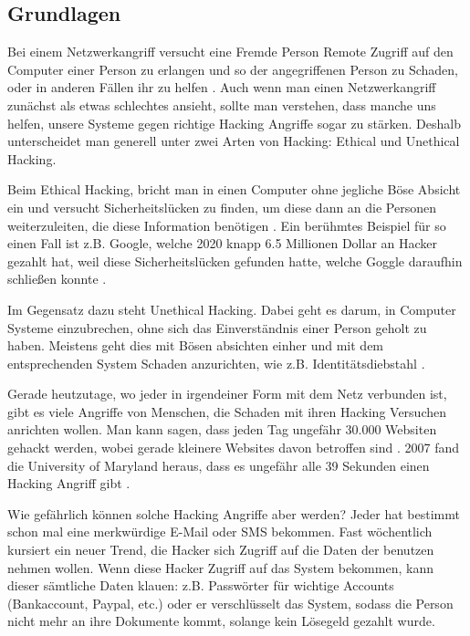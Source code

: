 \subsection{Grundlagen}
Bei einem Netzwerkangriff versucht eine Fremde Person Remote Zugriff auf den Computer einer Person zu erlangen und so der angegriffenen Person zu Schaden, oder in anderen Fällen ihr zu helfen \cite{ref_article1}. Auch wenn man einen Netzwerkangriff zunächst als etwas schlechtes ansieht, sollte man verstehen, dass manche uns helfen, unsere Systeme gegen richtige Hacking Angriffe sogar zu stärken. 
Deshalb unterscheidet man generell unter zwei Arten von Hacking: Ethical und Unethical Hacking. \par
Beim Ethical Hacking, bricht man in einen Computer ohne jegliche Böse Absicht ein und versucht Sicherheitslücken zu finden, um diese dann an die Personen weiterzuleiten, die diese Information benötigen \cite{ref_article1}. Ein berühmtes Beispiel für so einen Fall ist z.B. Google, welche 2020 knapp 6.5 Millionen Dollar an Hacker gezahlt hat, weil diese Sicherheitslücken gefunden hatte, welche Goggle daraufhin schließen konnte \cite{ref_url1}. \par
Im Gegensatz dazu steht Unethical Hacking. Dabei geht es darum, in Computer Systeme einzubrechen, ohne sich das Einverständnis einer Person geholt zu haben. Meistens geht dies mit Bösen absichten einher und mit dem entsprechenden System Schaden anzurichten, wie z.B. Identitätsdiebstahl \cite{ref_article1}. \par
Gerade heutzutage, wo jeder in irgendeiner Form mit dem Netz verbunden ist, gibt es viele Angriffe von Menschen, die Schaden mit ihren Hacking Versuchen anrichten wollen. Man kann sagen, dass jeden Tag ungefähr 30.000 Websiten gehackt werden, wobei gerade kleinere Websites davon betroffen sind \cite{ref_url2}. 2007 fand die University of Maryland heraus, dass es ungefähr alle 39 Sekunden einen Hacking Angriff gibt \cite{ref_url3}.\par
Wie gefährlich können solche Hacking Angriffe aber werden? Jeder hat bestimmt schon mal eine merkwürdige E-Mail oder SMS bekommen. Fast wöchentlich kursiert ein neuer Trend, die Hacker sich Zugriff auf die Daten der benutzen nehmen wollen. Wenn diese Hacker Zugriff auf das System bekommen, kann dieser sämtliche Daten klauen: z.B. Passwörter für wichtige Accounts (Bankaccount, Paypal, etc.) oder er verschlüsselt das System, sodass die Person nicht mehr an ihre Dokumente kommt, solange kein Lösegeld gezahlt wurde. \par
